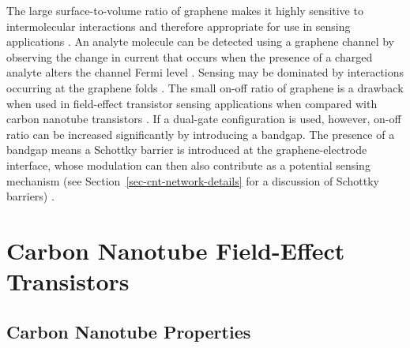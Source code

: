 \documentclass[
  a4paper,
]{scrbook}
\begin{document}
The large surface-to-volume ratio of graphene makes it highly sensitive
to intermolecular interactions and therefore appropriate for use in
sensing applications \autocite{Ohno2015,Tran2016}. An analyte molecule
can be detected using a graphene channel by observing the change in
current that occurs when the presence of a charged analyte alters the
channel Fermi level \autocite{Heller2010,Ohno2015}. Sensing may be
dominated by interactions occurring at the graphene folds
\autocite{Zhao2012}. The small on-off ratio of graphene is a drawback
when used in field-effect transistor sensing applications when compared
with carbon nanotube transistors \autocite{Novoselov2004}. If a
dual-gate configuration is used, however, on-off ratio can be increased
significantly by introducing a bandgap. The presence of a bandgap means
a Schottky barrier is introduced at the graphene-electrode interface,
whose modulation can then also contribute as a potential sensing
mechanism (see Section~\ref{sec-cnt-network-details} for a discussion of
Schottky barriers) \autocite{Xia2010}.

\hypertarget{carbon-nanotube-field-effect-transistors}{%
\section{Carbon Nanotube Field-Effect
Transistors}\label{carbon-nanotube-field-effect-transistors}}

\hypertarget{sec-carbon-nanotubes}{%
\subsection{Carbon Nanotube Properties}\label{sec-carbon-nanotubes}}
\end{document}
